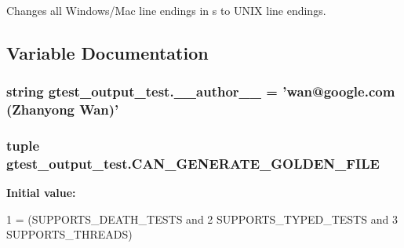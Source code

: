 \begin{DoxyVerb}Changes all Windows/Mac line endings in s to UNIX line endings.\end{DoxyVerb}
 

\subsection{Variable Documentation}
\hypertarget{namespacegtest__output__test_a9549d664d25c13351c08bfe88072f5cf}{
\subsubsection[{\-\_\-\-\_\-author\-\_\-\-\_\-}]{\setlength{\rightskip}{0pt plus 5cm}string gtest\-\_\-output\-\_\-test.\-\_\-\-\_\-author\-\_\-\-\_\- = 'wan@google.\-com (Zhanyong Wan)'}}\label{namespacegtest__output__test_a9549d664d25c13351c08bfe88072f5cf}
\hypertarget{namespacegtest__output__test_aa370a0da630f54a564d79507df196854}{
\subsubsection[{C\-A\-N\-\_\-\-G\-E\-N\-E\-R\-A\-T\-E\-\_\-\-G\-O\-L\-D\-E\-N\-\_\-\-F\-I\-L\-E}]{\setlength{\rightskip}{0pt plus 5cm}tuple gtest\-\_\-output\-\_\-test.\-C\-A\-N\-\_\-\-G\-E\-N\-E\-R\-A\-T\-E\-\_\-\-G\-O\-L\-D\-E\-N\-\_\-\-F\-I\-L\-E}}\label{namespacegtest__output__test_aa370a0da630f54a564d79507df196854}
{\bfseries Initial value\-:}
\begin{DoxyCode}
1 = (SUPPORTS\_DEATH\_TESTS \textcolor{keywordflow}{and}
2                             SUPPORTS\_TYPED\_TESTS \textcolor{keywordflow}{and}
3                             SUPPORTS\_THREADS)
\end{DoxyCode}

